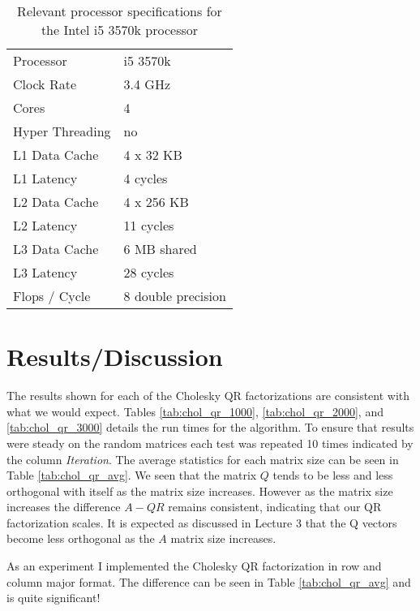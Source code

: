 \documentclass[11pt]{article}
\begin{document}
\begin{table}[!ht]
  \centering
  \caption{Relevant processor specifications for the Intel i5 3570k processor}
  \label{tab:i5_3570k}

  \vspace{3mm}
  \begin{tabular}{ l | l } 
    Processor & i5 3570k \\
    Clock Rate & 3.4 GHz \\
    Cores & 4 \\
    Hyper Threading & no \\
    L1 Data Cache & 4 x 32 KB \\
    L1 Latency & 4 cycles \\
    L2 Data Cache & 4 x 256 KB \\
    L2 Latency & 11 cycles \\
    L3 Data Cache & 6 MB shared \\
    L3 Latency & 28 cycles \\
    Flops / Cycle & 8 double precision
  \end{tabular}
\end{table}

\section{Results/Discussion}

The results shown for each of the Cholesky QR factorizations are consistent with what we would expect. Tables \ref{tab:chol_qr_1000}, \ref{tab:chol_qr_2000}, and \ref{tab:chol_qr_3000} details the run times for the algorithm. To ensure that results were steady on the random matrices each test was repeated 10 times indicated by the column \textit{Iteration}. The average statistics for each matrix size can be seen in Table \ref{tab:chol_qr_avg}. We seen that the matrix $Q$ tends to be less and less orthogonal with itself as the matrix size increases. However as the matrix size increases the difference $A - QR$ remains consistent, indicating that our QR factorization scales. It is expected as discussed in Lecture 3 that the Q vectors become less orthogonal as the $A$ matrix size increases. 

As an experiment I implemented the Cholesky QR factorization in row and column major format. The difference can be seen in Table \ref{tab:chol_qr_avg} and is quite significant!
\end{document}
